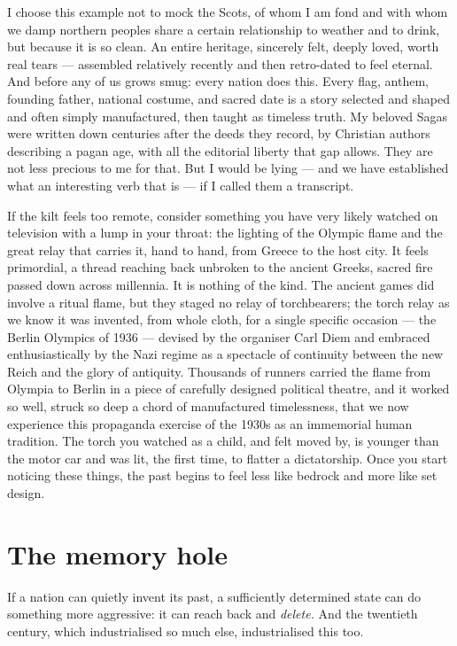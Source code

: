 I choose this example not to mock the Scots, of whom I am fond and with whom we damp northern peoples share a certain relationship to weather and to drink, but because it is so clean. An entire heritage, sincerely felt, deeply loved, worth real tears — assembled relatively recently and then retro-dated to feel eternal. And before any of us grows smug: every nation does this. Every flag, anthem, founding father, national costume, and sacred date is a story selected and shaped and often simply manufactured, then taught as timeless truth. My beloved Sagas were written down centuries after the deeds they record, by Christian authors describing a pagan age, with all the editorial liberty that gap allows. They are not less precious to me for that. But I would be lying — and we have established what an interesting verb that is — if I called them a transcript.

If the kilt feels too remote, consider something you have very likely watched on television with a lump in your throat: the lighting of the Olympic flame and the great relay that carries it, hand to hand, from Greece to the host city. It feels primordial, a thread reaching back unbroken to the ancient Greeks, sacred fire passed down across millennia. It is nothing of the kind. The ancient games did involve a ritual flame, but they staged no relay of torchbearers; the torch relay as we know it was invented, from whole cloth, for a single specific occasion — the Berlin Olympics of 1936 — devised by the organiser Carl Diem and embraced enthusiastically by the Nazi regime as a spectacle of continuity between the new Reich and the glory of antiquity. Thousands of runners carried the flame from Olympia to Berlin in a piece of carefully designed political theatre, and it worked so well, struck so deep a chord of manufactured timelessness, that we now experience this propaganda exercise of the 1930s as an immemorial human tradition. The torch you watched as a child, and felt moved by, is younger than the motor car and was lit, the first time, to flatter a dictatorship. Once you start noticing these things, the past begins to feel less like bedrock and more like set design.

\section*{The memory hole}

If a nation can quietly invent its past, a sufficiently determined state can do something more aggressive: it can reach back and \emph{delete.} And the twentieth century, which industrialised so much else, industrialised this too.

